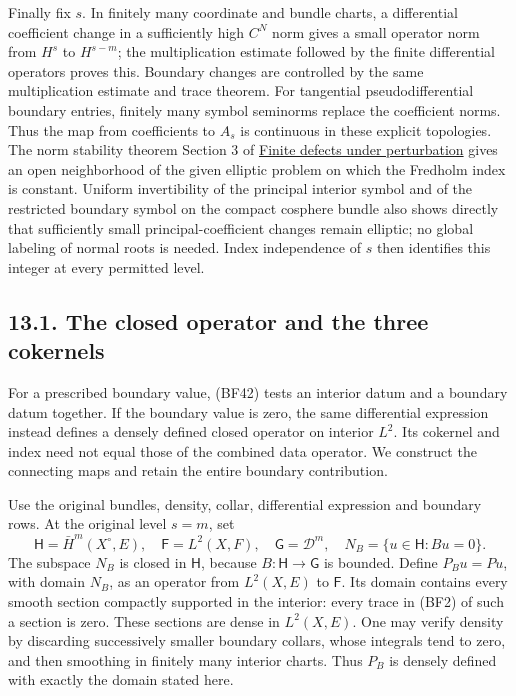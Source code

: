 \documentclass[
  11pt,
]{article}
\makeatletter
\let\ReaderOriginalAnchorStart\hyper@anchorstart
\let\ReaderOriginalAnchorEnd\hyper@anchorend
\let\ReaderPendingAliases\@empty
\def\ReaderArmAliases#1{\gdef\ReaderPendingAliases{#1}}
\def\hyper@anchorstart#1{\ReaderIfNativeAnchorTF{#1}{\ReaderPendingAliases\global\let\ReaderPendingAliases\@empty}{}\ReaderOriginalAnchorStart{#1}}
\makeatother
\begin{document}
Finally fix \(s\). In finitely many coordinate and bundle charts, a
differential coefficient change in a sufficiently high \(C^N\) norm
gives a small operator norm from \(H^s\) to \(H^{s-m}\); the
multiplication estimate followed by the finite differential operators
proves this. Boundary changes are controlled by the same multiplication
estimate and trace theorem. For tangential pseudodifferential boundary
entries, finitely many symbol seminorms replace the coefficient norms.
Thus the map from coefficients to \(A_s\) is continuous in these
explicit topologies. The norm stability theorem Section 3 of
\href{fredholm-stability.pdf}{Finite defects under perturbation} gives an
open neighborhood of the given elliptic problem on which the Fredholm
index is constant. Uniform invertibility of the principal interior
symbol and of the restricted boundary symbol on the compact cosphere
bundle also shows directly that sufficiently small principal-coefficient
changes remain elliptic; no global labeling of normal roots is needed.
Index independence of \(s\) then identifies this integer at every
permitted level.

\ReaderArmAliases{\ReaderOriginalAnchorStart{AN03-BF-CLOSED-001}\ReaderOriginalAnchorEnd\ReaderOriginalAnchorStart{131-the-closed-operator-and-the-three-cokernels}\ReaderOriginalAnchorEnd\begingroup\expandafter\def\csname @currentHref\endcsname{131-the-closed-operator-and-the-three-cokernels}\label{131-the-closed-operator-and-the-three-cokernels}\endgroup}
\subsection{13.1. The closed operator and the three
cokernels}\label{AN03-BF-CLOSED-001}

For a prescribed boundary value, (BF42) tests an interior datum and a
boundary datum together. If the boundary value is zero, the same
differential expression instead defines a densely defined closed
operator on interior \(L^2\). Its cokernel and index need not equal
those of the combined data operator. We construct the connecting maps
and retain the entire boundary contribution.

Use the original bundles, density, collar, differential expression and
boundary rows. At the original level \(s=m\), set \[
 \mathsf H=\bar H^m(X^\circ,E),\quad
 \mathsf F=L^2(X,F),\quad \mathsf G=\mathcal D^m,
 \quad N_B=\{u\in\mathsf H:Bu=0\}.
 \tag{BF46}
\] The subspace \(N_B\) is closed in \(\mathsf H\), because
\(B:\mathsf H\to\mathsf G\) is bounded. Define \(P_Bu=Pu\), with domain
\(N_B\), as an operator from \(L^2(X,E)\) to \(\mathsf F\). Its domain
contains every smooth section compactly supported in the interior: every
trace in (BF2) of such a section is zero. These sections are dense in
\(L^2(X,E)\). One may verify density by discarding successively smaller
boundary collars, whose integrals tend to zero, and then smoothing in
finitely many interior charts. Thus \(P_B\) is densely defined with
exactly the domain stated here.
\end{document}
